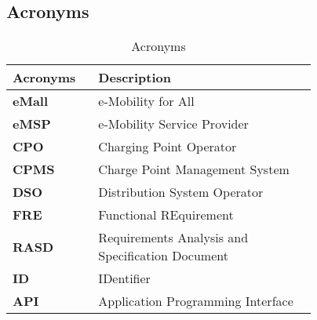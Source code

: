 \subsection{Acronyms} %
\label{subsec:acronyms}
\begin{table}[H]
\centering 
    \begin{tabular}{| p{0.175\linewidth} | p{0.6\linewidth} |}
    \hline
    \rowcolor{bluepoli!40}
     \textbf{Acronyms} & \textbf{Description} \T\B \\
    \hline \hline
    \textbf{eMall} & e-Mobility for All\T\B\\
    \hline
    \textbf{eMSP} & e-Mobility Service Provider\T\B\\
    \hline
    \textbf{CPO} & Charging Point Operator\T\B\\
    \hline
    \textbf{CPMS} & Charge Point Management System\T\B\\
    \hline
    \textbf{DSO} & Distribution System Operator\T\B\\
    \hline
    \textbf{FRE} & Functional REquirement\T\B\\
    \hline    
    \textbf{RASD} & Requirements Analysis and Specification Document\T\B\\
    \hline
    \textbf{ID} & IDentifier\T\B\\
    \hline
    \textbf{API} & Application Programming Interface\T\B\\
    \hline
    \end{tabular}
    \\[10pt]
    \caption{Acronyms}
\end{table}
